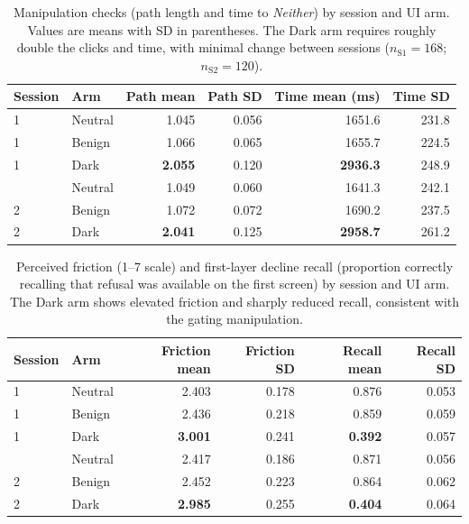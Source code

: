 \documentclass{eusset}
\begin{document}
\begin{table}[!h]
  \centering
  \begin{tabular}{l l r r r r}
    \textbf{Session} & \textbf{Arm} & \textbf{Path mean} & \textbf{Path SD} & \textbf{Time mean (ms)} & \textbf{Time SD} \\
    \hline
    1 & Neutral & 1.045 & 0.056 & 1651.6 & 231.8 \\
    1 & Benign  & 1.066 & 0.065 & 1655.7 & 224.5 \\
    1 & Dark    & \textbf{2.055} & 0.120 & \textbf{2936.3} & 248.9 \\
    \addlinespace
    2 & Neutral & 1.049 & 0.060 & 1641.3 & 242.1 \\
    2 & Benign  & 1.072 & 0.072 & 1690.2 & 237.5 \\
    2 & Dark    & \textbf{2.041} & 0.125 & \textbf{2958.7} & 261.2 \\
  \end{tabular}
  \caption{Manipulation checks (path length and time to \emph{Neither}) by session and UI arm. Values are means with SD in parentheses. The Dark arm requires roughly double the clicks and time, with minimal change between sessions ($n_{\text{S1}}{=}168$; $n_{\text{S2}}{=}120$).}
  \label{tab:manip_session}
\end{table}


\begin{table}[!h]
  \centering
  \begin{tabular}{l l r r r r}
    \textbf{Session} & \textbf{Arm} & \textbf{Friction mean} & \textbf{Friction SD} & \textbf{Recall mean} & \textbf{Recall SD} \\
    \hline
    1 & Neutral & 2.403 & 0.178 & 0.876 & 0.053 \\
    1 & Benign  & 2.436 & 0.218 & 0.859 & 0.059 \\
    1 & Dark    & \textbf{3.001} & 0.241 & \textbf{0.392} & 0.057 \\
    \addlinespace
    2 & Neutral & 2.417 & 0.186 & 0.871 & 0.056 \\
    2 & Benign  & 2.452 & 0.223 & 0.864 & 0.062 \\
    2 & Dark    & \textbf{2.985} & 0.255 & \textbf{0.404} & 0.064 \\
  \end{tabular}
  \caption{Perceived friction (1--7 scale) and first-layer decline recall (proportion correctly recalling that refusal was available on the first screen) by session and UI arm. The Dark arm shows elevated friction and sharply reduced recall, consistent with the gating manipulation.}
  \label{tab:manip_session_2}
\end{table}
\end{document}

